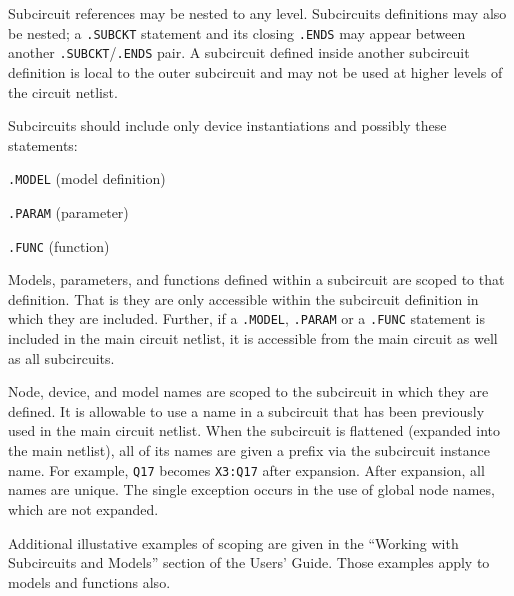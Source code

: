 \begin{Command}
Subcircuit references may be nested to any
level.  Subcircuits definitions may also be nested;
a \texttt{.SUBCKT} statement and its closing \texttt{.ENDS} may
appear between another \texttt{.SUBCKT}/\texttt{.ENDS} pair.  A
subcircuit defined inside another subcircuit definition is local to
the outer subcircuit and may not be used at higher levels of the
circuit netlist.

Subcircuits should include only device instantiations and possibly these
statements:
\begin{XyceItemize}
\item \texttt{.MODEL} (model definition)
\item \texttt{.PARAM} (parameter)
\item \texttt{.FUNC} (function)
\end{XyceItemize}

Models, parameters, and functions defined within a subcircuit are
scoped to that definition.  That is they are only
accessible within the subcircuit definition in which they are included.
Further, if a \texttt{.MODEL}, \texttt{.PARAM} or a \texttt{.FUNC} statement
is included in the main circuit netlist, it is accessible from the main
circuit as well as all subcircuits.

Node, device, and model names are scoped to the
subcircuit in which they are defined.  It is allowable to use a name in a
subcircuit that has been previously used in the main circuit netlist. When
the subcircuit is flattened (expanded into the main netlist), all of its
names are given a prefix via the subcircuit instance name.  For example,
\texttt{Q17} becomes \texttt{X3:Q17} after expansion.  After expansion, all
names are unique.  The single exception occurs in the use of global node
names, which are not expanded.

Additional illustative examples of scoping are given in the
``Working with Subcircuits and Models'' section of the \Xyce{} Users' 
Guide\UsersGuide.  Those examples apply to models and functions also.

\end{Command}
